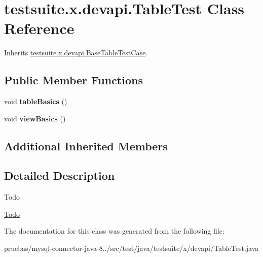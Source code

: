 \hypertarget{classtestsuite_1_1x_1_1devapi_1_1_table_test}{}\section{testsuite.\+x.\+devapi.\+Table\+Test Class Reference}
\label{classtestsuite_1_1x_1_1devapi_1_1_table_test}


Inherits \mbox{\hyperlink{classtestsuite_1_1x_1_1devapi_1_1_base_table_test_case}{testsuite.\+x.\+devapi.\+Base\+Table\+Test\+Case}}.

\subsection*{Public Member Functions}
\begin{DoxyCompactItemize}
\item 
\mbox{\label{classtestsuite_1_1x_1_1devapi_1_1_table_test_a1aff100d62d541e8b13aa28bf880d2b9}} 
void {\bfseries table\+Basics} ()
\item 
\mbox{\label{classtestsuite_1_1x_1_1devapi_1_1_table_test_ae3685af97260bbfe0e12aa371f38d059}} 
void {\bfseries view\+Basics} ()
\end{DoxyCompactItemize}
\subsection*{Additional Inherited Members}


\subsection{Detailed Description}
\begin{DoxyRefDesc}{Todo}
\item[\mbox{\hyperlink{todo__todo000011}{Todo}}]\end{DoxyRefDesc}


The documentation for this class was generated from the following file\+:\begin{DoxyCompactItemize}
\item 
pruebas/mysql-\/connector-\/java-\/8../src/test/java/testsuite/x/devapi/Table\+Test.\+java\end{DoxyCompactItemize}
